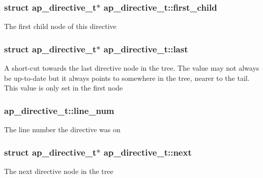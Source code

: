 \subsubsection[{\texorpdfstring{first\+\_\+child}{first_child}}]{\setlength{\rightskip}{0pt plus 5cm}struct {\bf ap\+\_\+directive\+\_\+t}$\ast$ ap\+\_\+directive\+\_\+t\+::first\+\_\+child}\hypertarget{structap__directive__t_acb47f52e698458241b560069f264b5e3}{}\label{structap__directive__t_acb47f52e698458241b560069f264b5e3}
The first child node of this directive 
\subsubsection[{\texorpdfstring{last}{last}}]{\setlength{\rightskip}{0pt plus 5cm}struct {\bf ap\+\_\+directive\+\_\+t}$\ast$ ap\+\_\+directive\+\_\+t\+::last}\hypertarget{structap__directive__t_afe428d970b3cc7c70993edf916143df1}{}\label{structap__directive__t_afe428d970b3cc7c70993edf916143df1}
A short-\/cut towards the last directive node in the tree. The value may not always be up-\/to-\/date but it always points to somewhere in the tree, nearer to the tail. This value is only set in the first node 
\subsubsection[{\texorpdfstring{line\+\_\+num}{line_num}}]{ ap\+\_\+directive\+\_\+t\+::line\+\_\+num}\hypertarget{structap__directive__t_a80fe1af1a12ee31f608a00d2150ca580}{}\label{structap__directive__t_a80fe1af1a12ee31f608a00d2150ca580}
The line number the directive was on 
\subsubsection[{\texorpdfstring{next}{next}}]{\setlength{\rightskip}{0pt plus 5cm}struct {\bf ap\+\_\+directive\+\_\+t}$\ast$ ap\+\_\+directive\+\_\+t\+::next}\hypertarget{structap__directive__t_a0d106e8328ddc177654ff6770455f485}{}\label{structap__directive__t_a0d106e8328ddc177654ff6770455f485}
The next directive node in the tree 
